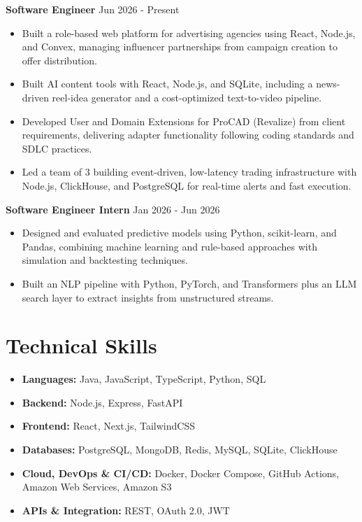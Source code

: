 \documentclass[a4paper,11pt]{article}
\newcommand{\resumeItem}[1]{\item \small{#1}}
\newcommand{\resumeSubHeadingListStart}{\begin{itemize}}
\newcommand{\resumeSubHeadingListEnd}{\end{itemize}}
\begin{document}
\textbf{Software Engineer} \hfill {Jun 2026 - Present}
\resumeSubHeadingListStart
\resumeItem{Built a role-based web platform for advertising agencies using React, Node.js, and Convex, managing influencer partnerships from campaign creation to offer distribution.}
\resumeItem{Built AI content tools with React, Node.js, and SQLite, including a news-driven reel-idea generator and a cost-optimized text-to-video pipeline.}
\resumeItem{Developed User and Domain Extensions for ProCAD (Revalize) from client requirements, delivering adapter functionality following coding standards and SDLC practices.}
\resumeItem{Led a team of 3 building event-driven, low-latency trading infrastructure with Node.js, ClickHouse, and PostgreSQL for real-time alerts and fast execution.}
\resumeSubHeadingListEnd

\textbf{Software Engineer Intern} \hfill {Jan 2026 - Jun 2026}
\resumeSubHeadingListStart
\resumeItem{Designed and evaluated predictive models using Python, scikit-learn, and Pandas, combining machine learning and rule-based approaches with simulation and backtesting techniques.}
\resumeItem{Built an NLP pipeline with Python, PyTorch, and Transformers plus an LLM search layer to extract insights from unstructured streams.}
\resumeSubHeadingListEnd


\section*{Technical Skills}
\begin{itemize}
\item \textbf{Languages:} Java, JavaScript, TypeScript, Python, SQL
\item \textbf{Backend:} Node.js, Express, FastAPI
\item \textbf{Frontend:} React, Next.js, TailwindCSS
\item \textbf{Databases:} PostgreSQL, MongoDB, Redis, MySQL, SQLite, ClickHouse
\item \textbf{Cloud, DevOps \& CI/CD:} Docker, Docker Compose, GitHub Actions, Amazon Web Services, Amazon S3
\item \textbf{APIs \& Integration:} REST, OAuth 2.0, JWT
\end{itemize}
\vspace{-0.2em}


\end{document}
